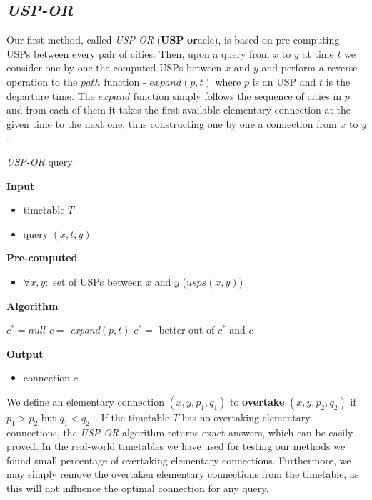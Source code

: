 \documentclass{svk_long_en}
\begin{document}
	\subsection{\textit{USP-OR}}
	
		Our first method, called \textit{USP-OR} (\textbf{USP} \textbf{or}acle), is based on pre-computing USPs between every pair of cities. Then, upon a query from $x$ to $y$ at time $t$ we consider one by one the computed USPs between $x$ and $y$ and perform a reverse operation to the $path$ function - $expand(p, t)$ where $p$ is an USP and $t$ is the departure time. The $expand$ function simply follows the sequence of cities in $p$ and from each of them it takes the first available elementary connection at the given time to the next one, thus constructing one by one a connection from $x$ to $y$. 
		
		\color{algcolor}
		\begin{algorithm}[H]
			\color{inalgcolor}
			\caption{\textit{USP-OR} query}
			\label{alg:uspor-query}
			\textbf{Input} 
			\begin{itemize}
				\item timetable $T$
				\item query $(x, t, y)$
			\end{itemize}
			\textbf{Pre-computed} 
			\begin{itemize}
				\item $\forall x, y:$ set of USPs between $x$ and $y$ ($usps(x, y)$)
			\end{itemize}
			\textbf{Algorithm}
			\begin{algorithmic}
				\STATE $c^{*} = null$
					\STATE $c =$ \textit{expand}$(p, t)$
					\STATE $c^{*} =$ better out of $c^{*}$ and $c$
				\ENDFOR
			\end{algorithmic}
			\textbf{Output}
			\begin{itemize}
				\item connection $c$
			\end{itemize}
		\end{algorithm}
		\color{black}

		We define an elementary connection $(x, y, p_{1}, q_{1})$ to \textbf{overtake} $(x, y, p_{2}, q_{2})$ if $p_{1} > p_{2}$ but $q_{1} < q_{2}$~\cite{tdroute09}. If the timetable $T$ has no overtaking elementary connections, the \textit{USP-OR} algorithm returns exact answers, which can be easily proved. In the real-world timetables we have used for testing our methods we found small percentage of overtaking elementary connections. Furthermore, we may simply remove the overtaken elementary connections from the timetable, as this will not influence the optimal connection for any query. \\
		
\end{document}
